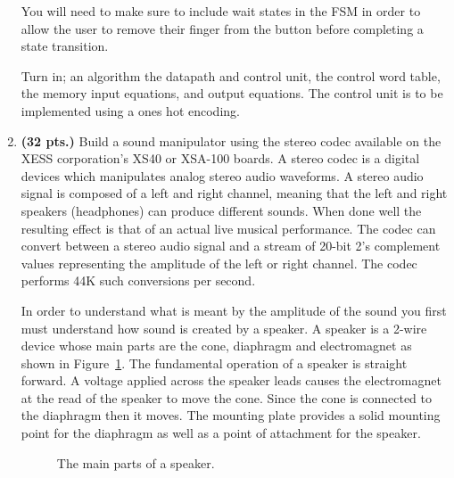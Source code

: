 \begin{enumerate}
You will need to make sure to include wait states in the FSM
in order to allow the user to remove their finger from the
button before completing a state transition.

Turn in; an algorithm
the datapath and control unit,
the control word table,
the memory input equations, and
output equations.
The control unit is to be implemented using a ones hot encoding.


\item {\bf(32 pts.)}
Build a sound manipulator using the stereo codec available on the
XESS corporation's XS40 or XSA-100 boards.  A stereo codec is a digital
devices which manipulates analog stereo audio waveforms.  A stereo audio signal
is composed of a left and right channel, meaning that the left and right
speakers (headphones) can produce different sounds.  When done well the
resulting effect is that of an actual live
musical performance.  The codec can convert between a stereo audio signal 
and a stream of 20-bit 2's complement values representing the amplitude
of the left or right channel.  The codec performs 44K such conversions 
per second.
 
In order to understand what is meant by the amplitude of the sound you first
must understand how sound is created by a speaker.  A speaker is a 2-wire
device whose main parts are the cone, diaphragm and electromagnet as 
shown in Figure~\ref{fig:speaker}.  The fundamental operation of a speaker 
is straight forward.  A voltage applied across the speaker leads causes
the electromagnet at the read of the speaker to move the cone.  Since
the cone is connected to the diaphragm then it moves. The mounting 
plate provides a solid mounting point for the diaphragm as well as a point
of attachment for the speaker.

\begin{figure}[ht]
\caption{The main parts of a speaker.}
\label{fig:speaker}
\end{figure}



\end{enumerate}
